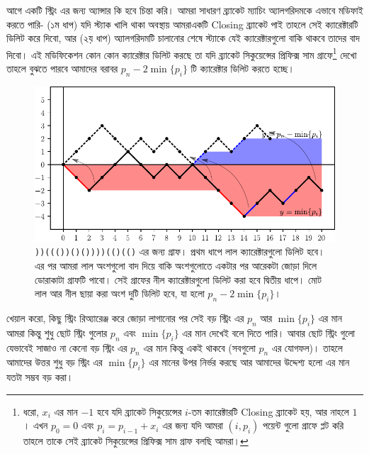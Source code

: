 \begin{solution}
আগে একটি স্ট্রিং এর জন্য অ্যান্সার কি হবে চিন্তা করি। আমরা সাধারণ ব্র্যাকেট ম্যাচিং অ্যালগরিদমকে এভাবে মডিফাই করতে পারি- (১ম ধাপ) যদি স্ট্যাক খালি থাকা অবস্থায় আমরাএকটি Closing ব্র্যাকেট পাই তাহলে সেই ক্যারেক্টারটি ডিলিট করে দিবো, আর (২য় ধাপ) অ্যালগরিদমটি চালানোর শেষে স্ট্যাকে যেই ক্যারেক্টারগুলো বাকি থাকবে তাদের বাদ দিবো। এই মডিফিকেশন কোন কোন ক্যারেক্টার ডিলিট করছে তা যদি ব্র্যাকেট সিকুয়েন্সের প্রিফিক্স সাম গ্রাফে\footnote{ধরো, $x_i$ এর মান $-1$ হবে যদি ব্র্যাকেট সিকুয়েন্সের $i$-তম ক্যারেক্টারটি Closing ব্র্যাকেট হয়, আর নাহলে $1$। এখন $p_0 = 0$ এবং $p_i = p_{i-1} + x_i$ এর জন্য যদি আমরা $(i, p_i)$ পয়েন্ট গুলো গ্রাফে প্লট করি তাহলে তাকে সেই ব্র্যাকেট সিকুয়েন্সের প্রিফিক্স সাম গ্রাফ বলছি আমরা।} দেখো তাহলে বুঝতে পারবে আমাদের বরাবর $p_n - 2\min\{p_i\}$ টি ক্যারেক্টার ডিলিট করতে হচ্ছে।
\begin{figure}[h]
  \centering
  \includegraphics[width = \linewidth]{./img/exchange-arg/bracket-sequence.pdf}
  \caption{\texttt{))((())()())))(()(()} এর জন্য গ্রাফ। প্রথম ধাপে লাল ক্যারেক্টারগুলো ডিলিট হবে। এর পর আমরা লাল অংশগুলো বাদ দিয়ে বাকি অংশগুলোতে একটার পর আরেকটা জোড়া দিলে ডোরাকাটা গ্রাফটি পাবো। সেই গ্রাফের নীল ক্যারেক্টারগুলো ডিলিট করা হবে দ্বিতীয় ধাপে। মোট লাল আর নীল ছায়া করা অংশ দুটি  ডিলিট হবে, যা হলো $p_n - 2\min\{p_i\}$।}
\end{figure}
খেয়াল করো, কিছু স্ট্রিং রিঅ্যারেঞ্জ করে জোড়া লাগানোর পর সেই বড় স্ট্রিং এর $p_n$ আর $\min\{p_i\}$ এর মান আমরা কিন্তু শুধু ছোট স্ট্রিং গুলোর $p_n$ এবং $\min\{p_i\}$ এর মান দেখেই বলে দিতে পারি। আবার ছোট স্ট্রিং গুলো যেভাবেই সাজাও না কেনো বড় স্ট্রিং এর $p_n$ এর মান কিন্তু একই থাকবে (সবগুলো $p_n$ এর যোগফল)। তাহলে আমাদের উত্তর শুধু বড় স্ট্রিং এর $\min\{p_i\}$ এর মানের উপর নির্ভর করছে আর আমাদের উদ্দেশ্য হলো এর মান যতটা সম্ভব বড় করা।


\end{solution}
